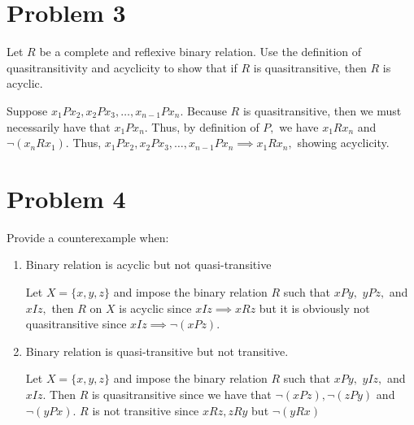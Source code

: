 \documentclass[11pt]{article}
\begin{document}
\newpage
\section*{Problem 3}
Let $R$ be a complete and reflexive binary relation. Use the definition of quasitransitivity and
acyclicity to show that if $R$ is quasitransitive, then $R$ is acyclic.
\begin{solution}
    Suppose $x_1Px_2, x_2 Px_3, \dots, x_{n-1}Px_n.$ Because $R$ is quasitransitive, then we must necessarily have that $x_1Px_n.$ Thus, by definition of $P,$ we have $x_1Rx_n$ and $\neg(x_nR x_1).$ Thus, $x_1Px_2, x_2 Px_3, \dots, x_{n-1}Px_n \implies x_1R x_n,$ showing acyclicity.
\end{solution}

\newpage
\section*{Problem 4}
\begin{problem}
    Provide a counterexample when:
\end{problem}
\begin{enumerate}
    \item 
    \begin{problem}
         Binary relation is acyclic but not quasi-transitive
    \end{problem}
    \begin{solution}
        Let $X = \{x,y,z\}$ and impose the binary relation $R$ such that $xPy,$ $yPz,$ and $xIz,$ then $R$ on $X$ is acyclic since $xIz \implies xRz$ but it is obviously not quasitransitive since $xIz \implies \neg(xPz)$.
    \end{solution}
    \item 
    \begin{problem}
         Binary relation is quasi-transitive but not transitive.
    \end{problem}
    \begin{solution}
        Let $X = \{x,y,z\}$ and impose the binary relation $R$ such that $xPy,$ $yIz,$ and $xIz.$ Then $R$ is quasitransitive since we have that $\neg (xPz), \neg (zPy)$ and $\neg (yPx).$ $R$ is not transitive since $xRz, zRy$ but $\neg (yRx)$
    \end{solution}
\end{enumerate}

\newpage
\end{document}
